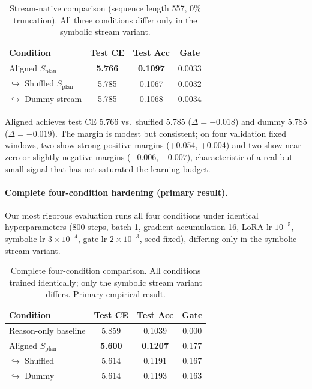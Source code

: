 \documentclass[11pt]{article}
\newcommand{\splan}{$S_{\mathrm{plan}}$}
\begin{document}
\begin{table}[h]
\centering
\small
\begin{tabular}{lccc}
\toprule
Condition & Test CE & Test Acc & Gate \\
\midrule
Aligned \splan{}                          & \textbf{5.766} & \textbf{0.1097} & 0.0033 \\
\quad$\hookrightarrow$ Shuffled \splan{} & 5.785 & 0.1067 & 0.0032 \\
\quad$\hookrightarrow$ Dummy stream      & 5.785 & 0.1068 & 0.0034 \\
\bottomrule
\end{tabular}
\caption{Stream-native comparison (sequence length 557, 0\% truncation).  All
  three conditions differ only in the symbolic stream variant.}
\label{tab:warmup}
\end{table}

Aligned achieves test CE 5.766 vs.\ shuffled 5.785 ($\Delta = -0.018$) and dummy
5.785 ($\Delta = -0.019$).  The margin is modest but consistent; on four validation
fixed windows, two show strong positive margins (+0.054, +0.004) and two show
near-zero or slightly negative margins ($-0.006$, $-0.007$), characteristic of a real
but small signal that has not saturated the learning budget.

\paragraph{Complete four-condition hardening (primary result).}
Our most rigorous evaluation runs all four conditions under identical hyperparameters
(800 steps, batch 1, gradient accumulation 16, LoRA lr $10^{-5}$, symbolic lr
$3\times10^{-4}$, gate lr $2\times10^{-3}$, seed fixed), differing only in the
symbolic stream variant.

\begin{table}[h]
\centering
\small
\begin{tabular}{lccc}
\toprule
Condition & Test CE & Test Acc & Gate \\
\midrule
Reason-only baseline               & 5.859 & 0.1039 & 0.000 \\
Aligned \splan{}                   & \textbf{5.600} & \textbf{0.1207} & 0.177 \\
\quad$\hookrightarrow$ Shuffled    & 5.614 & 0.1191 & 0.167 \\
\quad$\hookrightarrow$ Dummy       & 5.614 & 0.1193 & 0.163 \\
\bottomrule
\end{tabular}
\caption{Complete four-condition comparison.  All conditions trained identically;
  only the symbolic stream variant differs.  Primary empirical result.}
\label{tab:hardening}
\end{table}
\end{document}
